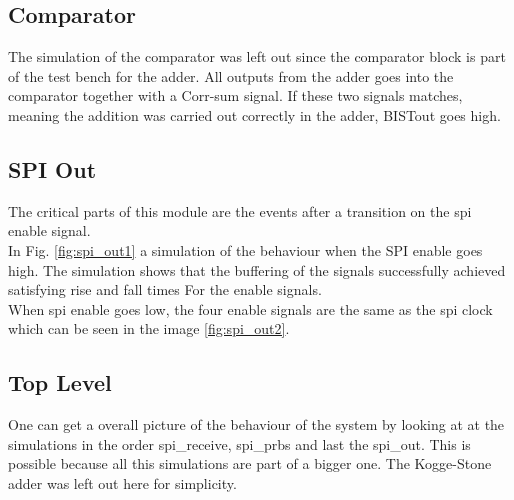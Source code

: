 \subsection{Comparator}
The simulation of the comparator was left out since the comparator block is part of the test bench for the adder. All outputs from the adder goes into the comparator together with a Corr-sum signal. If these two signals matches, meaning the addition was carried out correctly in the adder, BISTout goes high.

\subsection{SPI Out}
The critical parts of this module are the events after a transition on the spi enable signal.\\

In Fig. \ref{fig:spi_out1} a simulation of the behaviour when the SPI enable goes high. The simulation shows that the buffering of the signals successfully achieved satisfying rise and fall times For the enable signals.\\

When spi enable goes low, the four enable signals are the same as the spi clock which can be seen in the image \ref{fig:spi_out2}. \\

\subsection{Top Level}
One can get a overall picture of the behaviour of the system by looking at at the simulations in the order spi\_receive, spi\_prbs and last the spi\_out. This is possible because all this simulations are part of a bigger one. The Kogge-Stone adder was left out here for simplicity.
